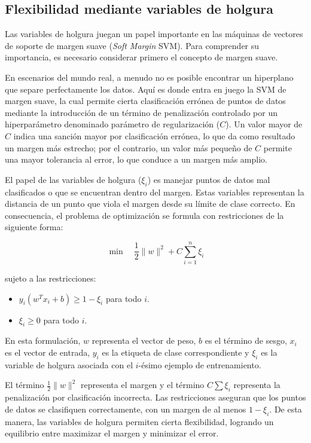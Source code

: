 \subsection{Flexibilidad mediante variables de holgura}

Las variables de holgura juegan un papel importante en las máquinas de vectores de soporte de margen suave (\textit{Soft Margin} SVM). Para comprender su importancia, es necesario considerar primero el concepto de margen suave.

En escenarios del mundo real, a menudo no es posible encontrar un hiperplano que separe perfectamente los datos. Aquí es donde entra en juego la SVM de margen suave, la cual permite cierta clasificación errónea de puntos de datos mediante la introducción de un término de penalización controlado por un hiperparámetro denominado parámetro de regularización ($C$). Un valor mayor de $C$ indica una sanción mayor por clasificación errónea, lo que da como resultado un margen más estrecho; por el contrario, un valor más pequeño de $C$ permite una mayor tolerancia al error, lo que conduce a un margen más amplio.



El papel de las variables de holgura ($\xi_i$) es manejar puntos de datos mal clasificados o que se encuentran dentro del margen. Estas variables representan la distancia de un punto que viola el margen desde su límite de clase correcto. En consecuencia, el problema de optimización se formula con restricciones de la siguiente forma:

\begin{equation}
\min \quad \frac{1}{2} \|w\|^2 + C \sum_{i=1}^{n} \xi_i
\end{equation}

\noindent sujeto a las restricciones:

\begin{itemize}
    \item $y_i(w^T x_i + b) \geq 1 - \xi_i$ para todo $i$.
    \item $\xi_i \geq 0$ para todo $i$.
\end{itemize}

En esta formulación, $w$ representa el vector de peso, $b$ es el término de sesgo, $x_i$ es el vector de entrada, $y_i$ es la etiqueta de clase correspondiente y $\xi_i$ es la variable de holgura asociada con el $i$-ésimo ejemplo de entrenamiento. 

El término $\frac{1}{2} \|w\|^2$ representa el margen y el término $C \sum \xi_i$ representa la penalización por clasificación incorrecta. Las restricciones aseguran que los puntos de datos se clasifiquen correctamente, con un margen de al menos $1 - \xi_i$. De esta manera, las variables de holgura permiten cierta flexibilidad, logrando un equilibrio entre maximizar el margen y minimizar el error. 

